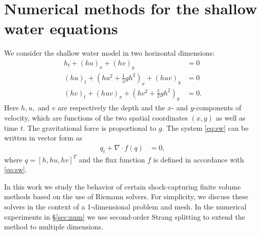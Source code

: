\documentclass[preprint, 11pt]{article}
\begin{document}
\section{Numerical methods for the shallow water equations} \label{sec2}
We consider the shallow water model in two horizontal dimensions:
\begin{subequations} \label{eq:sw}
\begin{align}
    h_t + (hu)_x + (hv)_y & = 0 \\
    (hu)_t + \left(hu^2 + \frac{1}{2}gh^2\right)_x + (huv)_y & = 0 \\
    (hv)_t + (huv)_x + \left(hv^2 + \frac{1}{2}gh^2\right)_y & = 0.
\end{align}
\end{subequations}
Here $h, u,$ and $v$ are respectively the depth and the $x$- and $y$-components of
velocity, which are functions of the two spatial coordinates $(x,y)$ as well as time $t$.
The gravitational force is proportional to $g$.
The system \eqref{eq:sw} can be written in vector form as
\begin{align}
    q_t + \nabla \cdot f(q) & = 0,
\end{align}
where $q=[h, hu, hv]^T$ and the flux function $f$ is defined in accordance
with \eqref{eq:sw}.

In this work we study the behavior of certain shock-capturing finite volume
methods based on the use of Riemann solvers.  For simplicity, we discuss these
solvers in the context of a 1-dimensional problem and mesh.  
In the numerical experiments in \S\ref{sec:num} we use second-order Strang
splitting \cite{strang1968construction} to extend the method to multiple dimensions.
\end{document}
